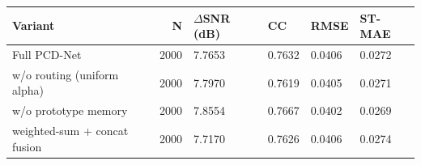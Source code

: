 \begin{tabular}{lrllll}
\toprule
Variant & N & $\Delta$SNR (dB) & CC & RMSE & ST-MAE \\
\midrule
Full PCD-Net & 2000 & 7.7653 & 0.7632 & 0.0406 & 0.0272 \\
w/o routing (uniform alpha) & 2000 & 7.7970 & 0.7619 & 0.0405 & 0.0271 \\
w/o prototype memory & 2000 & 7.8554 & 0.7667 & 0.0402 & 0.0269 \\
weighted-sum + concat fusion & 2000 & 7.7170 & 0.7626 & 0.0406 & 0.0274 \\
\bottomrule
\end{tabular}
